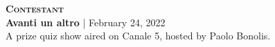 \textbf{\textsc{Contestant}} \\
\textbf{Avanti un altro} | February 24, 2022 \\
A prize quiz show aired on Canale 5, hosted by Paolo Bonolis.
\begin{center}
	\label{fig:next_one_please}
\end{center}
